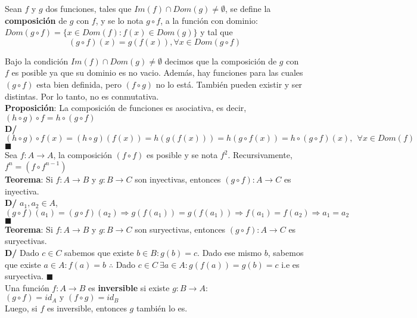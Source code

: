 \documentclass[11pt,a4paper]{article}
\newcommand*{\QEDA}{\null\nobreak\hfill\ensuremath{\blacksquare}}
\begin{document}
\noindent Sean $f$ y $g$ dos funciones, tales que $Im(f) \cap Dom(g) \not = \emptyset$, se define la \textbf{composici\'on} de $g$ con $f$, y se lo nota $g \circ f$, a la funci\'on con dominio: $Dom (g \circ f) = \{ x \in Dom(f) : f(x) \in Dom(g) \}$ y tal que $$(g \circ f) (x) = g(f(x)), \forall x \in Dom(g \circ f)$$

\noindent Bajo la condici\'on $Im(f) \cap Dom(g) \not = \emptyset$ decimos que la composici\'on de $g$ con $f$ es posible ya que su dominio es no vacio. Adem\'as, hay funciones para las cuales $(g\circ f)$ esta bien definida, pero $(f\circ g)$ no lo est\'a. Tambi\'en pueden existir y ser distintas. Por lo tanto, no es conmutativa.\\

\noindent \textbf{Proposici\'on}: La composici\'on de funciones es asociativa, es decir, $(h \circ g) \circ f = h \circ (g \circ f)$\\
\textbf{D/} 
$(h \circ g) \circ f(x)=
(h \circ g) (f(x)) = 
h(g(f(x))) = 
h(g \circ f(x)) =
h \circ (g \circ f) (x),\ \ \forall x \in Dom(f)$ \QEDA\\

\noindent Sea $f: A \rightarrow A$, la composici\'on $(f \circ f)$ es posible y se nota $f^2$. Recursivamente, $f^n = (f \circ f^{n-1})$\\

\noindent \textbf{Teorema}: Si $f: A \rightarrow B$ y $g: B \rightarrow C$ son inyectivas, entonces $(g \circ f) : A \rightarrow C$ es inyectiva.\\
\textbf{D/} $a_1, a_2 \in A$, $(g \circ f)(a_1) = (g \circ f)(a_2) \Rightarrow g(f(a_1)) = g(f(a_1)) \Rightarrow f(a_1) = f(a_2) \Rightarrow a_1 = a_2$ \QEDA\\

\noindent \textbf{Teorema}: Si $f: A \rightarrow B$ y $g: B \rightarrow C$ son suryectivas, entonces $(g \circ f) : A \rightarrow C$ es suryectivas.\\
\textbf{D/} Dado $c\in C$ sabemos que existe $b \in B : g(b)=c$. Dado ese mismo $b$, sabemos que existe $a\in A : f(a)=b$ $\therefore$ Dado $c \in C\ \exists a \in A : g(f(a)) = g(b) = c$ i.e es suryectiva. \QEDA\\

\noindent Una funci\'on $f : A \rightarrow B$ es \textbf{inversible} si existe $g : B \rightarrow A :$ $(g\circ f) = id_A \text{  y  } (f\circ g) = id_B$\\
Luego, si $f$ es inversible, entonces $g$ tambi\'en lo es.\\
\end{document}
